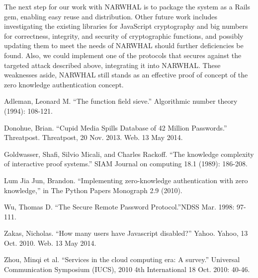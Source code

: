 \documentclass[11pt]{article}
\begin{document}
The next step for our work with NARWHAL is to package the system as a Rails gem, enabling easy reuse and distribution.  Other future work includes investigating the existing libraries for JavaScript cryptography and big numbers for correctness, integrity, and security of cryptographic functions, and possibly updating them to meet the needs of NARWHAL should further deficiencies be found.  Also, we could implement one of the protocols that secures against the targeted attack described above, integrating it into NARWHAL. These weaknesses aside, NARWHAL still stands as an effective proof of concept of the zero knowledge authentication concept.

\begin{thebibliography}{9}
Adleman, Leonard M. ``The function field sieve.'' Algorithmic number theory (1994): 108-121.

Donohue, Brian. ``Cupid Media Spills Database of 42 Million Passwords.'' Threatpost. Threatpost, 20 Nov. 2013. Web. 13 May 2014.

Goldwasser, Shafi, Silvio Micali, and Charles Rackoff. ``The knowledge complexity of interactive proof systems.'' SIAM Journal on computing 18.1 (1989): 186-208.

Lum Jia Jun, Brandon. ``Implementing zero-knowledge authentication with zero knowledge,'' in The Python Papers Monograph 2.9 (2010).

Wu, Thomas D. ``The Secure Remote Password Protocol.''NDSS Mar. 1998: 97-111.

Zakas, Nicholas. ``How many users have Javascript disabled?'' Yahoo. Yahoo, 13 Oct. 2010. Web. 13 May 2014.

Zhou, Minqi et al. ``Services in the cloud computing era: A survey.'' Universal Communication Symposium (IUCS), 2010 4th International 18 Oct. 2010: 40-46.

\end{thebibliography}
\end{document}
